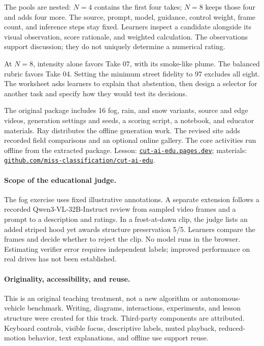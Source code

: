 \documentclass{article}
\begin{document}
The pools are nested: $N=4$ contains the first four takes; $N=8$ keeps those four and adds four more. The source, prompt, model, guidance, control weight, frame count, and inference steps stay fixed. Learners inspect a candidate alongside its visual observation, score rationale, and weighted calculation. The observations support discussion; they do not uniquely determine a numerical rating.

At $N=8$, intensity alone favors Take 07, with its smoke-like plume. The balanced rubric favors Take 04. Setting the minimum street fidelity to 97 excludes all eight. The worksheet asks learners to explain that abstention, then design a selector for another task and specify how they would test its decisions.

The original package includes 16 fog, rain, and snow variants, source and edge videos, generation settings and seeds, a scoring script, a notebook, and educator materials. Ray distributes the offline generation work. The revised site adds recorded field comparisons and an optional online gallery. The core activities run offline from the extracted package. Lesson: \href{https://cut-ai-edu.pages.dev/}{\texttt{cut-ai-edu.pages.dev}}; materials: \href{https://github.com/miss-classification/cut-ai-edu}{\texttt{github.com/miss-classification/cut-ai-edu}}.

\paragraph{Scope of the educational judge.} The fog exercise uses fixed illustrative annotations. A separate extension follows a recorded Qwen3-VL-32B-Instruct review from sampled video frames and a prompt to a description and ratings. In a frost-at-dawn clip, the judge lists an added striped hood yet awards structure preservation 5/5. Learners compare the frames and decide whether to reject the clip. No model runs in the browser. Estimating verifier error requires independent labels; improved performance on real drives has not been established.

\paragraph{Originality, accessibility, and reuse.} This is an original teaching treatment, not a new algorithm or autonomous-vehicle benchmark. Writing, diagrams, interactions, experiments, and lesson structure were created for this track. Third-party components are attributed. Keyboard controls, visible focus, descriptive labels, muted playback, reduced-motion behavior, text explanations, and offline use support reuse.
\end{document}
